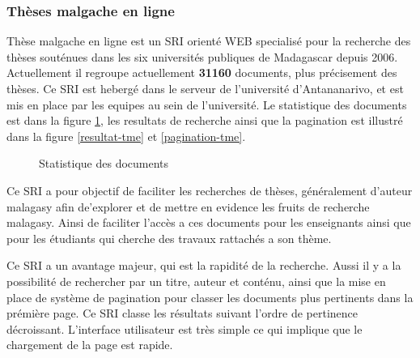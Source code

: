 \subsubsection{Thèses malgache en ligne}
Thèse malgache en ligne \citep{these-malgache-en-ligne} est un SRI orienté WEB specialisé pour la recherche des thèses souténues dans les six universités publiques de Madagascar depuis 2006. Actuellement il regroupe actuellement \textbf{31160} documents, plus précisement des thèses. Ce SRI est hebergé dans le serveur de l'université d'Antananarivo, et est mis en place par les equipes au sein de l'université. Le statistique des documents est dans la figure \ref{statistic-tme}, les resultats de recherche ainsi que la pagination est illustré dans la figure \ref{resultat-tme} et \ref{pagination-tme}.

\begin{figure}[htbp]
	\begin{center}
		\caption{Statistique des documents \citep{these-malgache-en-ligne}}
	\end{center}
	\label{statistic-tme}
\end{figure}

Ce SRI a pour objectif de faciliter les recherches de thèses, généralement d'auteur malagasy afin de'explorer et de mettre en evidence les fruits de recherche malagasy. Ainsi de faciliter l'accès a ces documents pour les enseignants ainsi que pour les étudiants qui cherche des travaux rattachés a son thème.

Ce SRI a un avantage majeur, qui est la rapidité de la recherche. Aussi il y a la possibilité de rechercher par un titre, auteur et conténu, ainsi que la mise en place de système de pagination pour classer les documents plus pertinents dans la prémière page. Ce SRI classe les résultats suivant l'ordre de pertinence décroissant. L'interface utilisateur est très simple ce qui implique que le chargement de la page est rapide.

